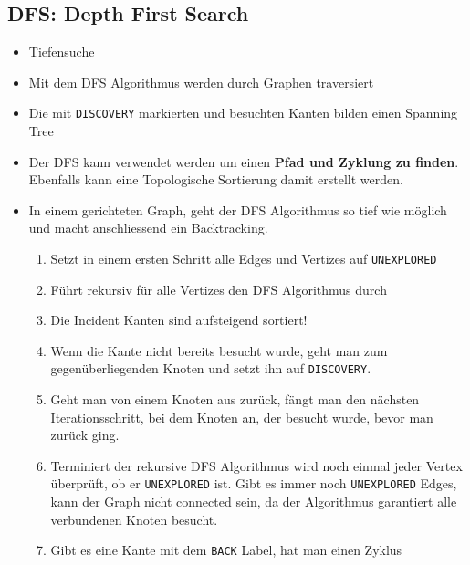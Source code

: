 \subsection{DFS: Depth First Search}
\begin{itemize}
	\item Tiefensuche
	\item Mit dem DFS Algorithmus werden durch Graphen traversiert
	\item Die mit \lstinline|DISCOVERY| markierten und besuchten Kanten bilden einen Spanning Tree
	\item Der DFS kann verwendet werden um einen \textbf{Pfad und Zyklung zu finden}. Ebenfalls kann eine Topologische Sortierung damit erstellt werden.
	\item In einem gerichteten Graph, geht der DFS Algorithmus so tief wie möglich und macht anschliessend ein Backtracking. 
	\begin{enumerate}
		\item Setzt in einem ersten Schritt alle Edges und Vertizes auf \lstinline|UNEXPLORED|
		\item Führt rekursiv für alle Vertizes den DFS Algorithmus durch
		\item Die Incident Kanten sind aufsteigend sortiert!
		\item Wenn die Kante nicht bereits besucht wurde, geht man zum gegenüberliegenden Knoten und setzt ihn auf \lstinline|DISCOVERY|.
		\item Geht man von einem Knoten aus zurück, fängt man den nächsten Iterationsschritt, bei dem Knoten an, der besucht wurde, bevor man zurück ging.
		\item Terminiert der rekursive DFS Algorithmus wird noch einmal jeder Vertex überprüft, ob er \lstinline|UNEXPLORED| ist. Gibt es immer noch \lstinline|UNEXPLORED| Edges, kann der Graph nicht connected sein, da der Algorithmus garantiert alle verbundenen Knoten besucht.
		\item Gibt es eine Kante mit dem \lstinline|BACK| Label, hat man einen Zyklus
	\end{enumerate}
\end{itemize}

